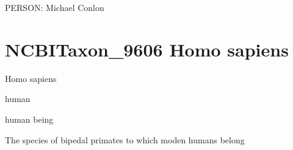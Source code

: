 \documentclass[letterpaper,10pt,english]{sphinxmanual}
\begin{document}
\begin{sphinxShadowBox}

\sphinxAtStartPar
{}
\end{sphinxShadowBox}

\begin{sphinxShadowBox}

\sphinxAtStartPar
{}
\end{sphinxShadowBox}

\begin{sphinxShadowBox}

\sphinxAtStartPar
PERSON: Michael Conlon
\end{sphinxShadowBox}
\begin{quote}
\label{\detokenize{doc-NCBITaxon_9606:ncbitaxon-9606}}\label{\detokenize{doc-NCBITaxon_9606:homo-sapiens}}\label{\detokenize{doc-NCBITaxon_9606:ncbitaxon-9606}}
\ignorespaces \end{quote}


\section{NCBITaxon\_9606 \sphinxhyphen{} Homo sapiens}
\label{\detokenize{doc-NCBITaxon_9606:ncbitaxon-9606-homo-sapiens}}\label{\detokenize{doc-NCBITaxon_9606:index-0}}\label{\detokenize{doc-NCBITaxon_9606::doc}}
\begin{sphinxShadowBox}

\sphinxAtStartPar
Homo sapiens
\end{sphinxShadowBox}

\begin{sphinxShadowBox}

\sphinxAtStartPar
human

\sphinxAtStartPar
human being
\end{sphinxShadowBox}

\begin{sphinxShadowBox}

\sphinxAtStartPar
The species of bipedal primates to which moden humans belong
\end{sphinxShadowBox}
\end{document}
